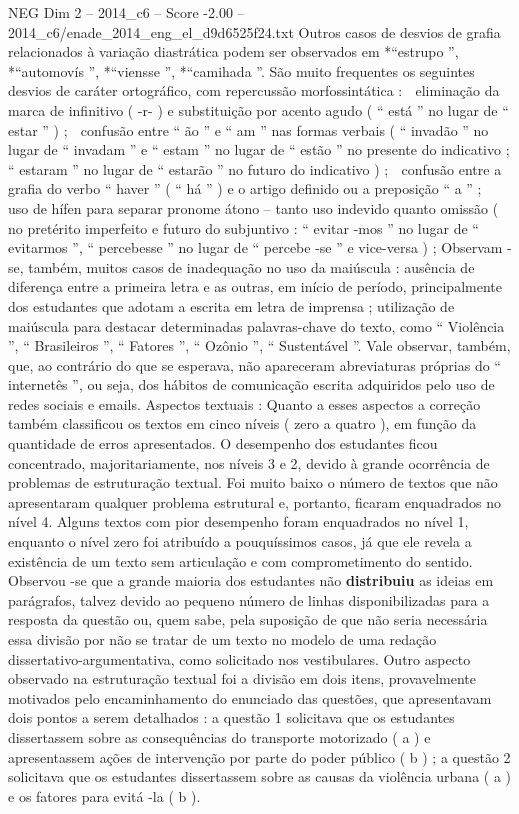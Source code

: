 \begin{textsample}{NEG Dim 2 – 2014\_c6 – Score -2.00 – 2014\_c6/enade\_2014\_eng\_el\_d9d6525f24.txt}
Outros casos de desvios de grafia relacionados à variação diastrática podem ser observados em *“estrupo ”, *“automovís ”, *“viensse ”, *“camihada ”.
São muito frequentes os seguintes desvios de caráter ortográfico, com repercussão morfossintática :  eliminação da marca de infinitivo ( -r- ) e substituição por acento agudo ( “ está ” no lugar de “ estar ” ) ;  confusão entre “ ão ” e “ am ” nas formas verbais ( “ invadão ” no lugar de “ invadam ” e “ estam ” no lugar de “ estão ” no presente do indicativo ; “ estaram ” no lugar de “ estarão ” no futuro do indicativo ) ;  confusão entre a grafia do verbo “ haver ” ( “ há ” ) e o artigo definido ou a preposição “ a ” ;  uso de hífen para separar pronome átono – tanto uso indevido quanto omissão ( no pretérito imperfeito e futuro do subjuntivo : “ evitar -mos ” no lugar de “ evitarmos ”, “ percebesse ” no lugar de “ percebe -se ” e vice-versa ) ; Observam -se, também, muitos casos de inadequação no uso da maiúscula : ausência de diferença entre a primeira letra e as outras, em início de período, principalmente dos estudantes que adotam a escrita em letra de imprensa ; utilização de maiúscula para destacar determinadas palavras-chave do texto, como “ Violência ”, “ Brasileiros ”, “ Fatores ”, “ Ozônio ”, “ Sustentável ”.
Vale observar, também, que, ao contrário do que se esperava, não apareceram abreviaturas próprias do “ internetês ”, ou seja, dos hábitos de comunicação escrita adquiridos pelo uso de redes sociais e emails.
Aspectos textuais : Quanto a esses aspectos a correção também classificou os textos em cinco níveis ( zero a quatro ), em função da quantidade de erros apresentados.
O desempenho dos estudantes ficou concentrado, majoritariamente, nos níveis 3 e 2, devido à grande ocorrência de problemas de estruturação textual.
Foi muito baixo o número de textos que não apresentaram qualquer problema estrutural e, portanto, ficaram enquadrados no nível 4.
Alguns textos com pior desempenho foram enquadrados no nível 1, enquanto o nível zero foi atribuído a pouquíssimos casos, já que ele revela a existência de um texto sem articulação e com comprometimento do sentido.
Observou -se que a grande maioria dos estudantes não \textbf{distribuiu} as ideias em parágrafos, talvez devido ao pequeno número de linhas disponibilizadas para a resposta da questão ou, quem sabe, pela suposição de que não seria necessária essa divisão por não se tratar de um texto no modelo de uma redação dissertativo-argumentativa, como solicitado nos vestibulares.
Outro aspecto observado na estruturação textual foi a divisão em dois itens, provavelmente motivados pelo encaminhamento do enunciado das questões, que apresentavam dois pontos a serem detalhados : a questão 1 solicitava que os estudantes dissertassem sobre as consequências do transporte motorizado ( a ) e apresentassem ações de intervenção por parte do poder público ( b ) ; a questão 2 solicitava que os estudantes dissertassem sobre as causas da violência urbana ( a ) e os fatores para evitá -la ( b ).

\end{textsample}
